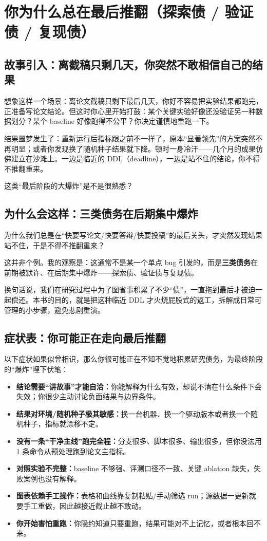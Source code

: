 \chapter{你为什么总在最后推翻（探索债 / 验证债 / 复现债）}
\label{ch:why_flip}

\section{故事引入：离截稿只剩几天，你突然不敢相信自己的结果}
想象这样一个场景：离论文截稿只剩下最后几天，你好不容易把实验结果都跑完，正准备写论文结论。但这时你心里开始打鼓：某个关键实验好像还没验证另一种数据划分？某个 baseline 好像跑得不公平？你决定谨慎地重跑一下。

结果噩梦发生了：重新运行后指标跟之前不一样了，原本“显著领先”的方案突然不再明显；或者你发现换了随机种子结果就下降。顿时一身冷汗——几个月的成果仿佛建立在沙滩上。一边是临近的 DDL（deadline），一边是站不住的结论，你不得不推翻重来。

这类“最后阶段的大爆炸”是不是很熟悉？

\section{为什么会这样：三类债务在后期集中爆炸}
为什么我们总是在“快要写论文/快要答辩/快要投稿”的最后关头，才突然发现结果站不住，于是不得不推翻重来？

这并非个例。我的观察是：这通常不是某一个单点 bug 引发的，而是\textbf{三类债务}在前期被默许、在后期集中爆炸——探索债、验证债与复现债。

换句话说，我们在研究过程中为了图省事积累了不少“债”，一直拖到最后才被迫一起偿还。本书的目的，就是把这种临近 DDL 才火烧屁股式的返工，拆解成日常可管理的小步骤，避免悲剧重演。

\section{症状表：你可能正在走向最后推翻}
以下症状如果似曾相识，那么你很可能正在不知不觉地积累研究债务，为最终阶段的“爆炸”埋下伏笔：
\begin{itemize}
  \item \textbf{结论需要“讲故事”才能自洽：}你能解释为什么有效，却说不清在什么条件下会失效；你很少主动讨论负面结果与边界条件。
  \item \textbf{结果对环境/随机种子极其敏感：}换一台机器、换一个驱动版本或者换一个随机种子，指标就漂移不定。
  \item \textbf{没有一条“干净主线”跑完全程：}分支很多、脚本很多、输出很多，但你没法用 1 条命令从预处理跑到论文主指标。
  \item \textbf{对照实验不完整：}baseline 不够强、评测口径不一致、关键 ablation 缺失，失败案例也没有解释。
  \item \textbf{图表依赖手工操作：}表格和曲线靠复制粘贴/手动筛选 run；源数据一更新就要手工重做，因此越接近截止越不敢动。
  \item \textbf{你开始害怕重跑：}你隐约知道只要重跑，结果可能对不上记忆，或者根本回不来。
\end{itemize}

